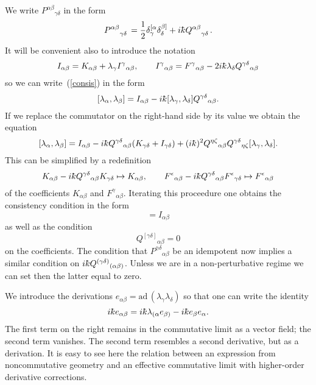 \documentclass[12pt,a4paper]{article}
\newcounter{eg}
\def\ad{\mbox{ad}\,}
\def\kbar{{\mathchar'26\mkern-9muk}}
\begin{document}
We write $P^{\alpha\beta}{}_{\gamma\delta}$ in the form
\begin{equation}
P^{\alpha\beta}{}^{\phantom{\alpha\beta}}_{\gamma\delta} = 
\frac 12 \delta^{[\alpha}_\gamma \delta^{\beta]}_\delta +
i\kbar Q^{\alpha\beta}{}^{\phantom{\alpha\beta}}_{\gamma\delta}.     \label{P}
\end{equation}
It will be convenient also to introduce the notation
\begin{equation}
I_{\alpha\beta} = 
K_{\alpha\beta} + \lambda_\gamma I^\gamma{}_{\alpha\beta}, \qquad
I^\gamma{}_{\alpha\beta} = F^\gamma{}_{\alpha\beta} - 
2i\kbar\lambda_\delta Q^{\gamma\delta}{}_{\alpha\beta}          \label{Gab}
\end{equation}
so we can write~(\ref{consis}) in the form
$$
[\lambda_\alpha, \lambda_\beta] = I_{\alpha\beta} -
i\kbar[\lambda_\gamma, \lambda_\delta]
Q^{\gamma\delta}{}_{\alpha\beta}.                           %
$$
If we replace the commutator on the right-hand side by its value we obtain
the equation
$$
[\lambda_\alpha, \lambda_\beta] = I_{\alpha\beta} -
i\kbar Q^{\gamma\delta}{}_{\alpha\beta}
(K_{\gamma\delta} + I_{\gamma\delta}) + (i\kbar)^2
Q^{\eta\zeta}{}_{\alpha\beta}  Q^{\gamma\delta}{}_{\eta\zeta}
[\lambda_\gamma, \lambda_\delta].
$$
This can be simplified by a redefinition 
$$
K_{\alpha\beta} - i\kbar Q^{\gamma\delta}{}_{\alpha\beta} K_{\gamma\delta}
\mapsto K_{\alpha\beta}, \qquad
F^\epsilon{}_{\alpha\beta} - 
i\kbar Q^{\gamma\delta}{}_{\alpha\beta} F^\epsilon{}_{\gamma\delta}
\mapsto F^\epsilon{}_{\alpha\beta}
$$
of the coefficients $K_{\alpha\beta}$ and $F^\gamma{}_{\alpha\beta}$.
Iterating this proceedure one obtains the consistency condition in the 
form
\begin{equation}
[\lambda_\alpha, \lambda_\beta] = I_{\alpha\beta}            \label{consis2}
\end{equation}
as well as the condition
$$
Q^{[\gamma\delta]}{}_{\alpha\beta} = 0 
$$
on the coefficients. The condition that
$P^{\gamma\delta}{}_{\alpha\beta}$ be an idempotent now implies a
similar condition on $i\kbar Q^{(\gamma\delta)}{}_{(\alpha\beta)}$.
Unless we are in a non-perturbative regime we can set then the latter
equal to zero.

We introduce the derivations
$e_{\alpha\beta} = \ad (\lambda_\gamma \lambda_\delta)$
so that one can write the identity
\begin{equation}
i\kbar e_{\alpha\beta} = i\kbar \lambda_{(\alpha} e_{\beta)} - 
i\kbar e_\beta e_\alpha.                                        \label{sc}
\end{equation}
The first term on the right remains in the commutative limit as a
vector field; the second term vanishes. The second term resembles a
second derivative, but as a derivation. It is easy to see here the
relation between an expression from noncommutative geometry and an
effective commutative limit with higher-order derivative corrections. 
\end{document}
